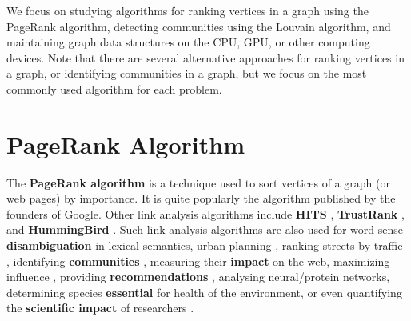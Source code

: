 We focus on studying algorithms for ranking vertices in a graph using the PageRank algorithm, detecting communities using the Louvain algorithm, and maintaining graph data structures on the CPU, GPU, or other computing devices. Note that there are several alternative approaches for ranking vertices in a graph, or identifying communities in a graph, but we focus on the most commonly used algorithm for each problem.




\section{PageRank Algorithm}

The \textbf{PageRank algorithm} is a technique used to sort vertices of a graph (or web pages) by importance. It is quite popularly the algorithm published by the founders of Google. Other link analysis algorithms include \textbf{HITS} \cite{hits-chien14}, \textbf{TrustRank} \cite{pr-gyongyi04}, and \textbf{HummingBird} \cite{pr-patil21}. Such link-analysis algorithms are also used for word sense \textbf{disambiguation} in lexical semantics, urban planning \cite{urban-zhang18}, ranking streets by traffic \cite{traffic-kim15}, identifying \textbf{communities} \cite{pr-kloumann17}, measuring their \textbf{impact} on the web, maximizing influence \cite{influence-zhang15}, providing \textbf{recommendations} \cite{recommend-chaudhari17}, analysing neural/protein networks, determining species \textbf{essential} for health of the environment, or even quantifying the \textbf{scientific impact} of researchers \cite{pr-senanayake15}.

